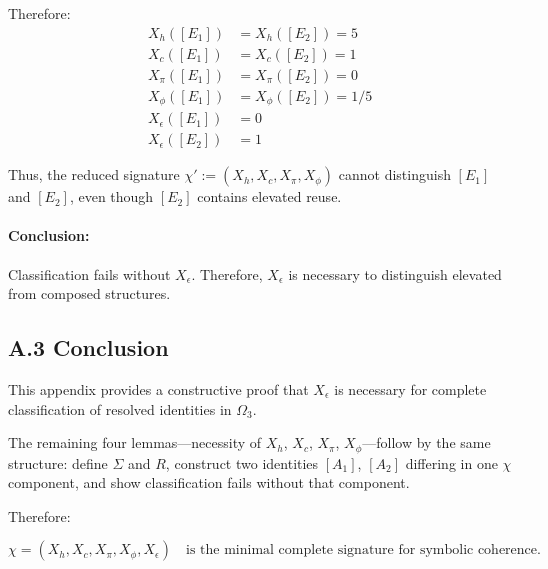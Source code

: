 Therefore:
\begin{align*}
    X_h([E_1]) &= X_h([E_2]) = 5 \\
    X_c([E_1]) &= X_c([E_2]) = 1 \\
    X_\pi([E_1]) &= X_\pi([E_2]) = 0 \\
    X_\phi([E_1]) &= X_\phi([E_2]) = 1/5 \\
    X_\epsilon([E_1]) &= 0 \\
    X_\epsilon([E_2]) &= 1
\end{align*}

\noindent
Thus, the reduced signature $\chi' := (X_h, X_c, X_\pi, X_\phi)$ cannot distinguish $[E_1]$ and $[E_2]$, even though $[E_2]$ contains elevated reuse.

\paragraph{Conclusion:} Classification fails without $X_\epsilon$. Therefore, $X_\epsilon$ is necessary to distinguish elevated from composed structures.

\subsection*{A.3 Conclusion}

This appendix provides a constructive proof that $X_\epsilon$ is necessary for complete classification of resolved identities in $\Omega_3$.

The remaining four lemmas—necessity of $X_h$, $X_c$, $X_\pi$, $X_\phi$—follow by the same structure: define $\Sigma$ and $R$, construct two identities $[A_1]$, $[A_2]$ differing in one $\chi$ component, and show classification fails without that component.

Therefore:

\[
\chi = (X_h, X_c, X_\pi, X_\phi, X_\epsilon)
\quad \text{is the minimal complete signature for symbolic coherence.}
\]
